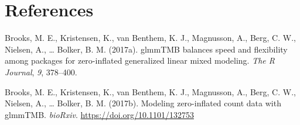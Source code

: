 \documentclass[floatsintext,man]{apa6}
\theoremstyle{definition}
\theoremstyle{definition}
\theoremstyle{definition}
\theoremstyle{remark}
\begin{document}
\FloatBarrier

\section{References}\label{refs}

\begingroup
\setlength{\parindent}{-0.5in} \setlength{\leftskip}{0.5in}

\hypertarget{refs}{}
\hypertarget{ref-R-glmmTMB}{}
Brooks, M. E., Kristensen, K., van Benthem, K. J., Magnusson, A., Berg,
C. W., Nielsen, A., \ldots{} Bolker, B. M. (2017a). glmmTMB balances
speed and flexibility among packages for zero-inflated generalized
linear mixed modeling. \emph{The R Journal}, \emph{9}, 378--400.

\hypertarget{ref-brooks2017modeling}{}
Brooks, M. E., Kristensen, K., van Benthem, K. J., Magnusson, A., Berg,
C. W., Nielsen, A., \ldots{} Bolker, B. M. (2017b). Modeling
zero-inflated count data with glmmTMB. \emph{bioRxiv}.
\url{https://doi.org/10.1101/132753}

\endgroup
\end{document}
